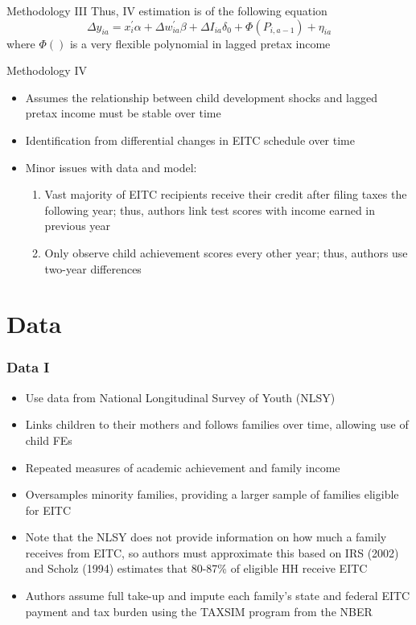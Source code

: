 \documentclass{beamer}
\begin{document}
\begin{frame}{Methodology III}
	Thus, IV estimation is of the following equation
	\begin{equation}
		\Delta y_{ia} = x_i^' \alpha + \Delta w_{ia}^' \beta + \Delta I_{ia} \delta_0 + \Phi(P_{i, a-1}) + \eta_{ia}
	\end{equation}
	where $\Phi()$ is a very flexible polynomial in lagged pretax income
\end{frame}

\begin{frame}{Methodology IV}
	\begin{itemize}
		\item Assumes the relationship between child development shocks and lagged pretax income must be stable over time
		\item Identification from differential changes in EITC schedule over time
		\item Minor issues with data and model:
		\begin{enumerate}[(1)]
			\item Vast majority of EITC recipients receive their credit after filing taxes the following year; thus, authors link test scores with income earned in previous year
			\item Only observe child achievement scores every other year; thus, authors use two-year differences
		\end{enumerate}
	\end{itemize}
\end{frame}

\section{Data}


\begin{frame}
\frametitle{Data I}
\begin{itemize}
	\item Use data from National Longitudinal Survey of Youth (NLSY)
	\item Links children to their mothers and follows families over time, allowing use of child FEs
	\item Repeated measures of academic achievement and family income
	\item Oversamples minority families, providing a larger sample of families eligible for EITC
	\item Note that the NLSY does not provide information on how much a family receives from EITC, so authors must approximate this based on IRS (2002) and Scholz (1994) estimates that 80-87\% of eligible HH receive EITC
	\item Authors assume full take-up and impute each family's state and federal EITC payment and tax burden using the TAXSIM program from the NBER
\end{itemize}
\end{frame}
\end{document}
